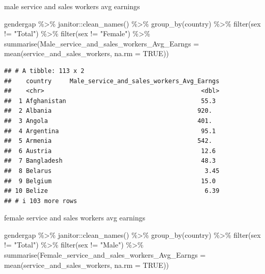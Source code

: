 \documentclass[
]{article}
\newenvironment{Shaded}{\begin{snugshade}}{\end{snugshade}}
\newcommand{\AttributeTok}[1]{\textcolor[rgb]{0.77,0.63,0.00}{#1}}
\newcommand{\ConstantTok}[1]{\textcolor[rgb]{0.00,0.00,0.00}{#1}}
\newcommand{\FunctionTok}[1]{\textcolor[rgb]{0.00,0.00,0.00}{#1}}
\newcommand{\NormalTok}[1]{#1}
\newcommand{\SpecialCharTok}[1]{\textcolor[rgb]{0.00,0.00,0.00}{#1}}
\newcommand{\StringTok}[1]{\textcolor[rgb]{0.31,0.60,0.02}{#1}}
\begin{document}
male service and sales workers avg earnings

\begin{Shaded}
\begin{Highlighting}[]
\NormalTok{gendergap }\SpecialCharTok{\%\textgreater{}\%}
\NormalTok{  janitor}\SpecialCharTok{::}\FunctionTok{clean\_names}\NormalTok{() }\SpecialCharTok{\%\textgreater{}\%}
  \FunctionTok{group\_by}\NormalTok{(country) }\SpecialCharTok{\%\textgreater{}\%} 
   \FunctionTok{filter}\NormalTok{(sex }\SpecialCharTok{!=} \StringTok{"Total"}\NormalTok{) }\SpecialCharTok{\%\textgreater{}\%}
  \FunctionTok{filter}\NormalTok{(sex }\SpecialCharTok{!=} \StringTok{"Female"}\NormalTok{) }\SpecialCharTok{\%\textgreater{}\%}
  \FunctionTok{summarise}\NormalTok{(}\AttributeTok{Male\_service\_and\_sales\_workers\_Avg\_Earngs =} \FunctionTok{mean}\NormalTok{(service\_and\_sales\_workers, }\AttributeTok{na.rm =} \ConstantTok{TRUE}\NormalTok{))}
\end{Highlighting}
\end{Shaded}

\begin{verbatim}
## # A tibble: 113 x 2
##    country     Male_service_and_sales_workers_Avg_Earngs
##    <chr>                                           <dbl>
##  1 Afghanistan                                     55.3 
##  2 Albania                                        920.  
##  3 Angola                                         401.  
##  4 Argentina                                       95.1 
##  5 Armenia                                        542.  
##  6 Austria                                         12.6 
##  7 Bangladesh                                      48.3 
##  8 Belarus                                          3.45
##  9 Belgium                                         15.0 
## 10 Belize                                           6.39
## # i 103 more rows
\end{verbatim}

female service and sales workers avg earnings

\begin{Shaded}
\begin{Highlighting}[]
\NormalTok{gendergap }\SpecialCharTok{\%\textgreater{}\%}
\NormalTok{  janitor}\SpecialCharTok{::}\FunctionTok{clean\_names}\NormalTok{() }\SpecialCharTok{\%\textgreater{}\%}
  \FunctionTok{group\_by}\NormalTok{(country) }\SpecialCharTok{\%\textgreater{}\%} 
   \FunctionTok{filter}\NormalTok{(sex }\SpecialCharTok{!=} \StringTok{"Total"}\NormalTok{) }\SpecialCharTok{\%\textgreater{}\%}
  \FunctionTok{filter}\NormalTok{(sex }\SpecialCharTok{!=} \StringTok{"Male"}\NormalTok{) }\SpecialCharTok{\%\textgreater{}\%}
  \FunctionTok{summarise}\NormalTok{(}\AttributeTok{Female\_service\_and\_sales\_workers\_Avg\_Earngs =} \FunctionTok{mean}\NormalTok{(service\_and\_sales\_workers, }\AttributeTok{na.rm =} \ConstantTok{TRUE}\NormalTok{))}
\end{Highlighting}
\end{Shaded}
\end{document}
